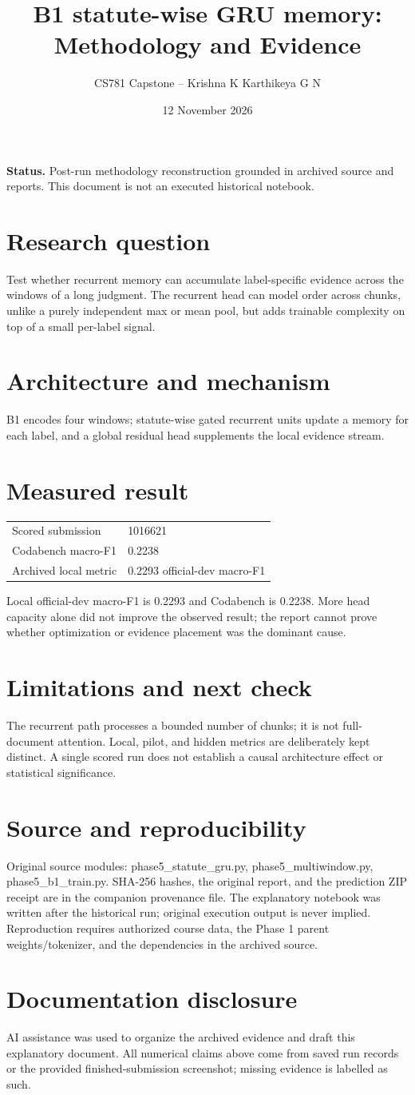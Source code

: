 \documentclass[11pt,a4paper]{article}
\title{B1 statute-wise GRU memory: Methodology and Evidence}
\author{CS781 Capstone -- Krishna K Karthikeya G N}
\date{12 November 2026}
\begin{document}
\maketitle
\noindent\textbf{Status.} Post-run methodology reconstruction grounded in archived source and reports. This document is not an executed historical notebook.\par
\section*{Research question}
Test whether recurrent memory can accumulate label-specific evidence across the windows of a long judgment. The recurrent head can model order across chunks, unlike a purely independent max or mean pool, but adds trainable complexity on top of a small per-label signal.
\section*{Architecture and mechanism}
B1 encodes four windows; statute-wise gated recurrent units update a memory for each label, and a global residual head supplements the local evidence stream.
\section*{Measured result}
\begin{center}\begin{tabular}{ll}Scored submission & 1016621\\
Codabench macro-F1 & 0.2238\\
Archived local metric & 0.2293 official-dev macro-F1\end{tabular}\end{center}
Local official-dev macro-F1 is 0.2293 and Codabench is 0.2238. More head capacity alone did not improve the observed result; the report cannot prove whether optimization or evidence placement was the dominant cause.
\section*{Limitations and next check}
The recurrent path processes a bounded number of chunks; it is not full-document attention. Local, pilot, and hidden metrics are deliberately kept distinct. A single scored run does not establish a causal architecture effect or statistical significance.
\section*{Source and reproducibility}
Original source modules: phase5\_statute\_gru.py, phase5\_multiwindow.py, phase5\_b1\_train.py. SHA-256 hashes, the original report, and the prediction ZIP receipt are in the companion provenance file. The explanatory notebook was written after the historical run; original execution output is never implied. Reproduction requires authorized course data, the Phase 1 parent weights/tokenizer, and the dependencies in the archived source.
\section*{Documentation disclosure}
AI assistance was used to organize the archived evidence and draft this explanatory document. All numerical claims above come from saved run records or the provided finished-submission screenshot; missing evidence is labelled as such.
\end{document}
